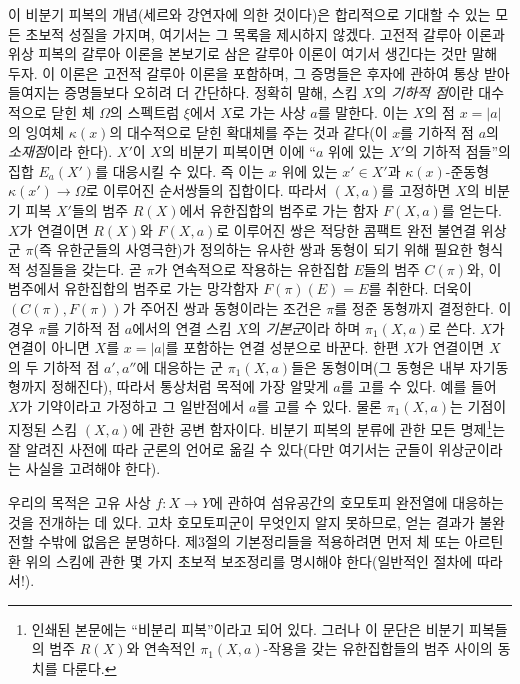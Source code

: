 \documentclass[11pt,twoside,openany]{book}
\numberwithin{equation}{section}
\newcommand{\sourceunit}{front}
\newcommand{\src}[1]{%
  \phantomsection\hypertarget{src:\sourceunit:#1}{}%
  \marginpar{\raggedleft\footnotesize\sffamily #1}%
}
\theoremstyle{plain}
\theoremstyle{definition}
\theoremstyle{remark}
\begin{document}
\src{210}
이 비분기 피복의 개념(세르와 강연자에 의한 것이다)은 합리적으로 기대할
수 있는 모든 초보적 성질을 가지며, 여기서는 그 목록을 제시하지 않겠다.
고전적 갈루아 이론과 위상 피복의 갈루아 이론을 본보기로 삼은 갈루아
이론이 여기서 생긴다는 것만 말해 두자. 이 이론은 고전적 갈루아 이론을
포함하며, 그 증명들은 후자에 관하여 통상 받아들여지는 증명들보다 오히려
더 간단하다. 정확히 말해, 스킴 $X$의 \emph{기하적 점}이란 대수적으로
닫힌 체 $\Omega$의 스펙트럼 $\xi$에서 $X$로 가는 사상 $a$를 말한다.
이는 $X$의 점 $x=|a|$의 잉여체 $\kappa(x)$의 대수적으로 닫힌 확대체를
주는 것과 같다(이 $x$를 기하적 점 $a$의 \emph{소재점}이라 한다).
$X'$이 $X$의 비분기 피복이면 이에 ``$a$ 위에 있는 $X'$의 기하적
점들''의 집합 $E_a(X')$를 대응시킬 수 있다. 즉 이는 $x$ 위에 있는
$x'\in X'$과 $\kappa(x)$-준동형
$\kappa(x')\longrightarrow\Omega$로 이루어진 순서쌍들의 집합이다.
따라서 $(X,a)$를 고정하면 $X$의 비분기 피복 $X'$들의 범주 $R(X)$에서
유한집합의 범주로 가는 함자 $F(X,a)$를 얻는다. $X$가 연결이면 $R(X)$와
$F(X,a)$로 이루어진 쌍은 적당한 콤팩트 완전 불연결 위상군 $\pi$(즉
유한군들의 사영극한)가 정의하는 유사한 쌍과 동형이 되기 위해 필요한
형식적 성질들을 갖는다. 곧 $\pi$가 연속적으로 작용하는 유한집합 $E$들의
범주 $C(\pi)$와, 이 범주에서 유한집합의 범주로 가는 망각함자
$F(\pi)(E)=E$를 취한다. 더욱이 $(C(\pi),F(\pi))$가 주어진 쌍과
동형이라는 조건은 $\pi$를 정준 동형까지 결정한다. 이 경우 $\pi$를
기하적 점 $a$에서의 연결 스킴 $X$의 \emph{기본군}이라 하며
$\pi_1(X,a)$로 쓴다. $X$가 연결이 아니면 $X$를 $x=|a|$를 포함하는
연결 성분으로 바꾼다. 한편 $X$가 연결이면 $X$의 두 기하적 점
$a',a''$에 대응하는 군 $\pi_1(X,a)$들은 동형이며(그 동형은 내부
자기동형까지 정해진다), 따라서 통상처럼 목적에 가장 알맞게 $a$를
고를 수 있다. 예를 들어 $X$가 기약이라고 가정하고 그 일반점에서
$a$를 고를 수 있다. 물론 $\pi_1(X,a)$는 기점이 지정된 스킴 $(X,a)$에
관한 공변 함자이다. 비분기 피복의 분류에 관한 모든 명제\footnote{인쇄된
본문에는 ``비분리 피복''이라고 되어 있다. 그러나 이 문단은 비분기
피복들의 범주 $R(X)$와 연속적인 $\pi_1(X,a)$-작용을 갖는 유한집합들의
범주 사이의 동치를 다룬다.}는 잘 알려진 사전에 따라 군론의 언어로
옮길 수 있다(다만 여기서는 군들이 위상군이라는 사실을 고려해야 한다).

\src{211}
우리의 목적은 고유 사상 $f:X\longrightarrow Y$에 관하여 섬유공간의
호모토피 완전열에 대응하는 것을 전개하는 데 있다. 고차 호모토피군이
무엇인지 알지 못하므로, 얻는 결과가 불완전할 수밖에 없음은 분명하다.
제3절의 기본정리들을 적용하려면 먼저 체 또는 아르틴 환 위의 스킴에
관한 몇 가지 초보적 보조정리를 명시해야 한다(일반적인 절차에 따라서!).
\end{document}

